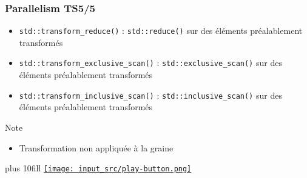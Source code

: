 \documentclass[C++.tex]{subfiles}
\begin{document}
\begin{frame}[fragile]
	\frametitle{Parallelism TS\titlehfill{}5/5}
	\begin{itemize}
		\item \lstinline|std::transform_reduce()| : \lstinline|std::reduce()| sur des éléments préalablement transformés
		\item \lstinline|std::transform_exclusive_scan()| : \lstinline|std::exclusive_scan()| sur des éléments préalablement transformés
		\item \lstinline|std::transform_inclusive_scan()| : \lstinline|std::inclusive_scan()| sur des éléments préalablement transformés
	\end{itemize}

	\begin{block}{Note}
		\begin{itemize}
			\item Transformation non appliquée à la graine
		\end{itemize}
	\end{block}

	\vskip 10mm plus 10fill
	\hfill
	\href{https://godbolt.org/#g:!((g:!((g:!((h:codeEditor,i:(filename:'1',fontScale:14,fontUsePx:'0',j:1,lang:c%2B%2B,selection:(endColumn:2,endLineNumber:18,positionColumn:2,positionLineNumber:18,selectionStartColumn:2,selectionStartLineNumber:18,startColumn:2,startLineNumber:18),source:'%23include+%3Ciostream%3E%0A%23include+%3Cvector%3E%0A%23include+%3Cnumeric%3E%0A%0Aint+main()%0A%7B%0A++std::vector%3Cint%3E+foo+%7B5,+42,+58%7D%3B%0A++std::vector%3Cint%3E+bar%3B%0A%0A++std::exclusive_scan(std::begin(foo),+std::end(foo),+std::back_inserter(bar),+8)%3B%0A%0A++for+(const+auto+it+:+bar)%0A++%7B%0A%09++std::cout+%3C%3C+it+%3C%3C+%22+%22%3B%0A++%7D%0A++std::cout+%3C%3C+%22%5Cn%22%3B%0A%7D%0A+'),l:'5',n:'0',o:'C%2B%2B+source+%231',t:'0')),k:50,l:'4',n:'0',o:'',s:0,t:'0'),(g:!((h:executor,i:(argsPanelShown:'1',compilationPanelShown:'0',compiler:g112,compilerOutShown:'0',execArgs:'',execStdin:'',fontScale:14,fontUsePx:'0',j:1,lang:c%2B%2B,libs:!((name:boost,ver:'175')),options:'-std%3Dc%2B%2B17+-Wall+-Wextra',source:1,stdinPanelShown:'1',tree:'1',wrap:'0'),l:'5',n:'0',o:'Executor+x86-64+gcc+11.2+(C%2B%2B,+Editor+%231)',t:'0')),header:(),k:50,l:'4',n:'0',o:'',s:0,t:'0')),l:'2',n:'0',o:'',t:'0')),version:4}{\texttt{[image: input\_src/play-button.png]}}
\end{frame}
\end{document}
